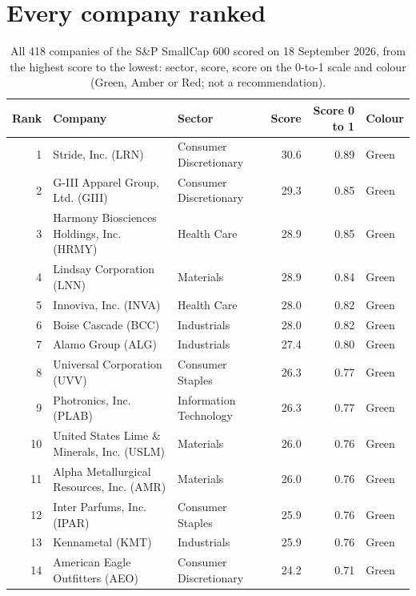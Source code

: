 \documentclass[11pt,a4paper]{article}
\begin{document}
\section{Every company ranked}
\label{app:ranking}
{\small
\begin{longtable}{r p{4.6cm} p{3cm} r r l}
\caption{All 418 companies of the S\&P SmallCap 600 scored on 18 September 2026, from the highest score to the lowest: sector, score, score on the 0-to-1 scale and colour (Green, Amber or Red; not a recommendation).}\label{tab:ranking}\\
\hline
Rank & Company & Sector & Score & Score 0 to 1 & Colour \\
\hline
\endhead
1 & Stride, Inc. (LRN) & Consumer Discretionary & 30.6 & 0.89 & \cellcolor[HTML]{C6EFCE}Green \\
2 & G-III Apparel Group, Ltd. (GIII) & Consumer Discretionary & 29.3 & 0.85 & \cellcolor[HTML]{C6EFCE}Green \\
3 & Harmony Biosciences Holdings, Inc. (HRMY) & Health Care & 28.9 & 0.85 & \cellcolor[HTML]{C6EFCE}Green \\
4 & Lindsay Corporation (LNN) & Materials & 28.9 & 0.84 & \cellcolor[HTML]{C6EFCE}Green \\
5 & Innoviva, Inc. (INVA) & Health Care & 28.0 & 0.82 & \cellcolor[HTML]{C6EFCE}Green \\
6 & Boise Cascade (BCC) & Industrials & 28.0 & 0.82 & \cellcolor[HTML]{C6EFCE}Green \\
7 & Alamo Group (ALG) & Industrials & 27.4 & 0.80 & \cellcolor[HTML]{C6EFCE}Green \\
8 & Universal Corporation (UVV) & Consumer Staples & 26.3 & 0.77 & \cellcolor[HTML]{C6EFCE}Green \\
9 & Photronics, Inc. (PLAB) & Information Technology & 26.3 & 0.77 & \cellcolor[HTML]{C6EFCE}Green \\
10 & United States Lime \& Minerals, Inc. (USLM) & Materials & 26.0 & 0.76 & \cellcolor[HTML]{C6EFCE}Green \\
11 & Alpha Metallurgical Resources, Inc. (AMR) & Materials & 26.0 & 0.76 & \cellcolor[HTML]{C6EFCE}Green \\
12 & Inter Parfums, Inc. (IPAR) & Consumer Staples & 25.9 & 0.76 & \cellcolor[HTML]{C6EFCE}Green \\
13 & Kennametal (KMT) & Industrials & 25.9 & 0.76 & \cellcolor[HTML]{C6EFCE}Green \\
14 & American Eagle Outfitters (AEO) & Consumer Discretionary & 24.2 & 0.71 & \cellcolor[HTML]{C6EFCE}Green \\

\end{longtable}}
\end{document}
